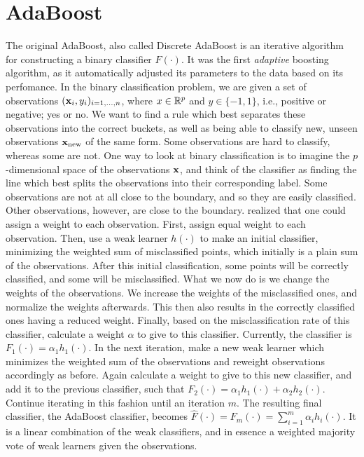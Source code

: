\section{AdaBoost}
The original AdaBoost, also called Discrete AdaBoost \citep{adaboost} is an iterative algorithm for constructing a binary classifier $F(\cdot)$. It was the first \textit{adaptive} boosting algorithm, as it automatically adjusted its parameters to the data based on its perfomance. In the binary classification problem, we are given a set of observations $(\mathbf{x}_i,y_i)_{i=1,\ldots,n}$, where $x\in\mathbb{R}^p$ and $y\in\{-1,1\}$, i.e., positive or negative; yes or no. We want to find a rule which best separates these observations into the correct buckets, as well as being able to classify new, unseen observations $\mathbf{x}_{\text{new}}$ of the same form. Some observations are hard to classify, whereas some are not. One way to look at binary classification is to imagine the $p$-dimensional space of the observations $\mathbf{x}$, and think of the classifier as finding the line which best splits the observations into their corresponding label. Some observations are not at all close to the boundary, and so they are easily classified. Other observations, however, are close to the boundary. \citet{adaboost} realized that one could assign a weight to each observation. First, assign equal weight to each observation. Then, use a weak learner $h(\cdot)$ to make an initial classifier, minimizing the weighted sum of misclassified points, which initially is a plain sum of the observations. After this initial classification, some points will be correctly classified, and some will be misclassified. What we now do is we change the weights of the observations. We increase the weights of the misclassified ones, and normalize the weights afterwards. This then also results in the correctly classified ones having a reduced weight. Finally, based on the misclassification rate of this classifier, calculate a weight $\alpha$ to give to this classifier. Currently, the classifier is $F_1(\cdot)=\alpha_1h_1(\cdot).$ In the next iteration, make a new weak learner which minimizes the weighted sum of the observations and reweight observations accordingly as before. Again calculate a weight to give to this new classifier, and add it to the previous classifier, such that $F_2(\cdot)=\alpha_1h_1(\cdot)+\alpha_2h_2(\cdot)$. Continue iterating in this fashion until an iteration $m$. The resulting final classifier, the AdaBoost classifier, becomes $\hat{F}(\cdot)=F_m(\cdot)=\sum_{i=1}^m\alpha_ih_i(\cdot)$. It is a linear combination of the weak classifiers, and in essence a weighted majority vote of weak learners given the observations.

